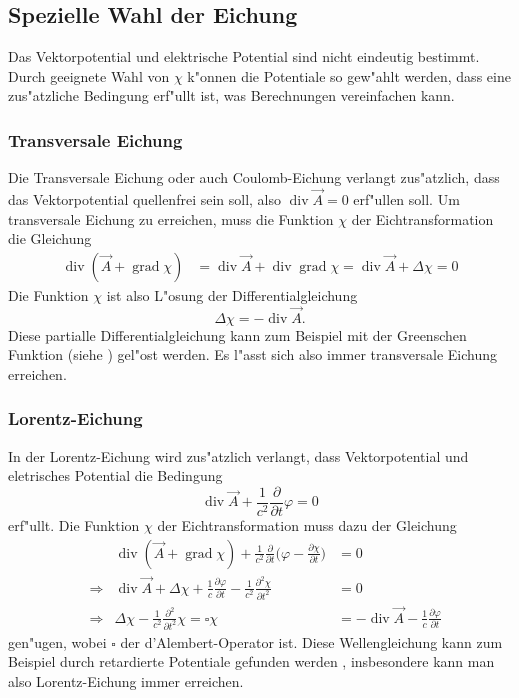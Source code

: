 \subsection{Spezielle Wahl der Eichung}
Das Vektorpotential und elektrische Potential sind nicht eindeutig bestimmt.
Durch geeignete Wahl von $\chi$ k"onnen die Potentiale so gew"ahlt
werden, dass eine zus"atzliche Bedingung erf"ullt ist, was Berechnungen
vereinfachen kann.

\subsubsection{Transversale Eichung}

Die Transversale Eichung oder auch Coulomb-Eichung verlangt zus"atzlich,
dass das Vektorpotential quellenfrei sein soll,
also $\operatorname{div}\vec A=0$ erf"ullen soll.
Um transversale Eichung zu erreichen, muss die Funktion $\chi$
der Eichtransformation die Gleichung
\begin{align*}
\operatorname{div}(\vec A+\operatorname{grad}\chi)
&=
\operatorname{div}\vec A + \operatorname{div}\operatorname{grad}\chi
=
\operatorname{div}\vec A + \Delta\chi
=0
\end{align*}
Die Funktion $\chi$ ist also L"osung der Differentialgleichung
\[
\Delta \chi = -\operatorname{div}\vec A.
\]
Diese partialle Differentialgleichung kann zum Beispiel mit der
Greenschen Funktion (siehe \cite[p.~33]{skript:evans}) gel"ost werden.
Es l"asst sich also immer transversale Eichung erreichen.

\subsubsection{Lorentz-Eichung}
In der Lorentz-Eichung wird zus"atzlich verlangt, dass Vektorpotential
und eletrisches Potential die Bedingung
\[
\operatorname{div}\vec A+\frac1{c^2}\frac{\partial}{\partial t}\varphi=0
\]
erf"ullt.
Die Funktion $\chi$ der Eichtransformation muss dazu der Gleichung
\begin{equation*}
\begin{aligned}
&&
\operatorname{div}(\vec A+\operatorname{grad}\chi)
+
\frac1{c^2}\frac{\partial}{\partial t}
\biggl(\varphi-\frac{\partial\chi}{\partial t}\biggr)
&=0
\\
&\Rightarrow&
\operatorname{div}\vec A +\Delta\chi
+
\frac{1}{c}\frac{\partial\varphi}{\partial t}
-
\frac1{c^2}\frac{\partial^2\chi}{\partial t^2}
&=0
\\
&\Rightarrow&
\Delta\chi-\frac1{c^2}\frac{\partial^2}{\partial t^2}\chi
=
\square\chi
&=
-\operatorname{div}\vec A-\frac1{c}\frac{\partial\varphi}{\partial t}
\end{aligned}
\end{equation*}
gen"ugen, wobei $\square$ der d'Alembert-Operator ist.
Diese Wellengleichung kann zum Beispiel durch retardierte Potentiale 
gefunden werden \cite[p.~82]{skript:evans}, insbesondere kann man also
Lorentz-Eichung immer erreichen.

